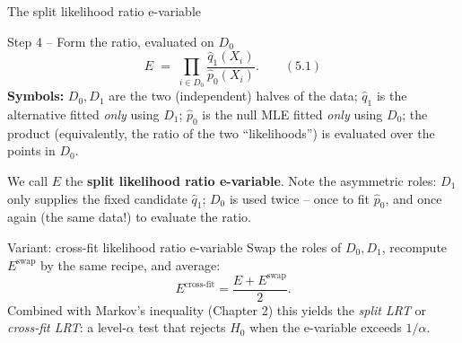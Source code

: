 \documentclass[aspectratio=169,10pt]{beamer}
\begin{document}
\begin{frame}{The split likelihood ratio e-variable}

  \begin{block}{Step 4 -- Form the ratio, evaluated on $D_0$}
    $$ E \;=\; \prod_{i \in D_0} \frac{\hat q_1(X_i)}{\hat p_0(X_i)}. \qquad (5.1)$$
    \textbf{Symbols:} $D_0, D_1$ are the two (independent) halves of
    the data; $\hat q_1$ is the alternative fitted \emph{only} using
    $D_1$; $\hat p_0$ is the null MLE fitted \emph{only} using $D_0$;
    the product (equivalently, the ratio of the two ``likelihoods'') is
    evaluated over the points in $D_0$.
  \end{block}

  We call $E$ the \textbf{split likelihood ratio e-variable}. Note the
  asymmetric roles: $D_1$ only supplies the fixed candidate $\hat q_1$;
  $D_0$ is used twice -- once to fit $\hat p_0$, and once again (the
  same data!) to evaluate the ratio.

  \begin{alertblock}{Variant: cross-fit likelihood ratio e-variable}
    Swap the roles of $D_0,D_1$, recompute $E^{\text{swap}}$ by the same
    recipe, and average:
    $$ E^{\text{cross-fit}} = \frac{E + E^{\text{swap}}}{2}. $$
    Combined with Markov's inequality (Chapter 2) this yields the
    \emph{split LRT} or \emph{cross-fit LRT}: a level-$\alpha$ test that
    rejects $H_0$ when the e-variable exceeds $1/\alpha$.
  \end{alertblock}

\end{frame}
\end{document}
